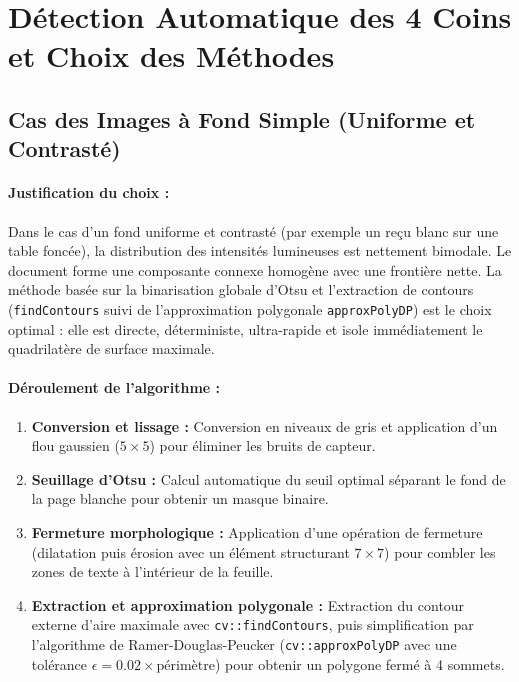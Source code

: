 \documentclass[a4paper,11pt]{article}
\begin{document}
\section{Détection Automatique des 4 Coins et Choix des Méthodes}

\subsection{Cas des Images à Fond Simple (Uniforme et Contrasté)}

\paragraph{Justification du choix :}
Dans le cas d'un fond uniforme et contrasté (par exemple un reçu blanc sur une table foncée), la distribution des intensités lumineuses est nettement bimodale. Le document forme une composante connexe homogène avec une frontière nette. La méthode basée sur la binarisation globale d'Otsu et l'extraction de contours (\texttt{findContours} suivi de l'approximation polygonale \texttt{approxPolyDP}) est le choix optimal : elle est directe, déterministe, ultra-rapide et isole immédiatement le quadrilatère de surface maximale.

\paragraph{Déroulement de l'algorithme :}
\begin{enumerate}
    \item \textbf{Conversion et lissage :} Conversion en niveaux de gris et application d'un flou gaussien ($5 \times 5$) pour éliminer les bruits de capteur.
    \item \textbf{Seuillage d'Otsu :} Calcul automatique du seuil optimal séparant le fond de la page blanche pour obtenir un masque binaire.
    \item \textbf{Fermeture morphologique :} Application d'une opération de fermeture (dilatation puis érosion avec un élément structurant $7 \times 7$) pour combler les zones de texte à l'intérieur de la feuille.
    \item \textbf{Extraction et approximation polygonale :} Extraction du contour externe d'aire maximale avec \texttt{cv::findContours}, puis simplification par l'algorithme de Ramer-Douglas-Peucker (\texttt{cv::approxPolyDP} avec une tolérance $\epsilon = 0.02 \times \text{périmètre}$) pour obtenir un polygone fermé à 4 sommets.
\end{enumerate}
\end{document}
